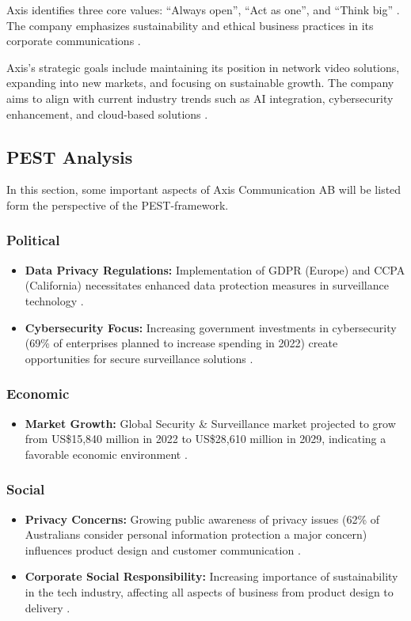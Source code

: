 \documentclass{article}
\begin{document}
Axis identifies three core values: \enquote{Always open}, \enquote{Act as one}, and \enquote{Think big} \cite{axis_sustainability2023}. The company emphasizes sustainability and ethical business practices in its corporate communications \cite{axis_sustainability2023}. 

Axis's strategic goals include maintaining its position in network video solutions, expanding into new markets, and focusing on sustainable growth. The company aims to align with current industry trends such as AI integration, cybersecurity enhancement, and cloud-based solutions \cite{axis_trends2022}.


\subsection{PEST Analysis}
In this section, some important aspects of Axis Communication AB will be listed form the perspective of the PEST-framework.

\subsubsection{Political}
\begin{itemize}
    \item \textbf{Data Privacy Regulations:} Implementation of GDPR (Europe) and CCPA (California) necessitates enhanced data protection measures in surveillance technology \cite{iapp2023}.
    \item \textbf{Cybersecurity Focus:} Increasing government investments in cybersecurity (69\% of enterprises planned to increase spending in 2022) create opportunities for secure surveillance solutions \cite{aipix2023}.
\end{itemize}

\subsubsection{Economic}
\begin{itemize}
    \item \textbf{Market Growth:} Global Security \& Surveillance market projected to grow from US\$15,840 million in 2022 to US\$28,610 million in 2029, indicating a favorable economic environment \cite{mckinsey2023}.
\end{itemize}

\subsubsection{Social}
\begin{itemize}
    \item \textbf{Privacy Concerns:} Growing public awareness of privacy issues (62\% of Australians consider personal information protection a major concern) influences product design and customer communication \cite{iapp2023}.
    \item \textbf{Corporate Social Responsibility:} Increasing importance of sustainability in the tech industry, affecting all aspects of business from product design to delivery \cite{axis2022}.
\end{itemize}
\end{document}
